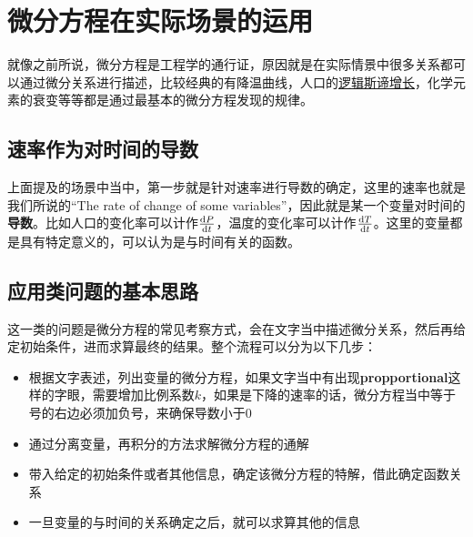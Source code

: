 \section{微分方程在实际场景的运用}
就像之前所说，微分方程是工程学的通行证，原因就是在实际情景中很多关系都可以通过微分关系进行描述，比较经典的有降温曲线，人口的\href{https://www.maa.org/press/periodicals/loci/joma/logistic-growth-model-background-logistic-modeling}{逻辑斯谛增长}，化学元素的衰变等等都是通过最基本的微分方程发现的规律。

\subsection*{速率作为对时间的导数}
上面提及的场景中当中，第一步就是针对速率进行导数的确定，这里的速率也就是我们所说的``The
 rate of change of some variables''，因此就是某一个变量对时间的\textbf{导数}。比如人口的变化率可以计作$\frac{{\mathrm{d}} P}{{\mathrm{d}} t}$，温度的变化率可以计作$\frac{{\mathrm{d}} T}{{\mathrm{d}} t}$。这里的变量都是具有特定意义的，可以认为是与时间有关的函数。

\subsection*{应用类问题的基本思路}
这一类的问题是微分方程的常见考察方式，会在文字当中描述微分关系，然后再给定初始条件，进而求算最终的结果。整个流程可以分为以下几步：
\begin{SummBox}
\begin{itemize}
	\item 根据文字表述，列出变量的微分方程，如果文字当中有出现\textbf{propportional}这样的字眼，需要增加比例系数$k$，如果是下降的速率的话，微分方程当中等于号的右边必须加负号，来确保导数小于$0$
	\item 通过分离变量，再积分的方法求解微分方程的通解
	\item 带入给定的初始条件或者其他信息，确定该微分方程的特解，借此确定函数关系
	\item 一旦变量的与时间的关系确定之后，就可以求算其他的信息
\end{itemize}
\end{SummBox}

